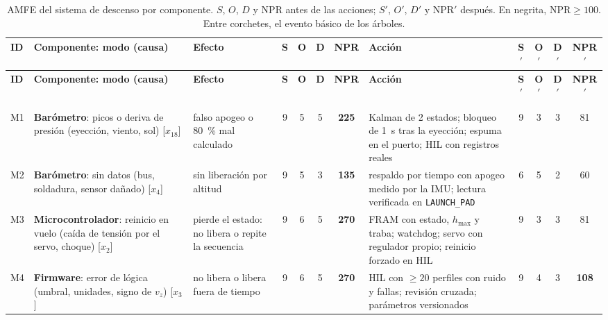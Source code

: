 \par\ifdim\dimexpr\pagegoal-\pagetotal\relax<7cm\newpage\fi
{\scriptsize
\setlength{\tabcolsep}{2.2pt}
\renewcommand{\arraystretch}{1.12}
\begin{longtable}{@{}>{\raggedright\arraybackslash}p{0.55cm}>{\raggedright\arraybackslash}p{3.9cm}>{\raggedright\arraybackslash}p{2.6cm}cccc>{\raggedright\arraybackslash}p{4.18cm}cccc@{}}
\caption{AMFE del sistema de descenso por componente. $S$, $O$, $D$ y NPR antes de las
acciones; $S'$, $O'$, $D'$ y NPR$'$ después. En negrita, $\mathrm{NPR}\ge100$. Entre
corchetes, el evento básico de los árboles.}\label{tab:confiabilidad-amfe}\\
\toprule
\textbf{ID} & \textbf{Componente: modo (causa)} & \textbf{Efecto} & \textbf{S} & \textbf{O} & \textbf{D} & \textbf{NPR} & \textbf{Acción} & \textbf{S$'$} & \textbf{O$'$} & \textbf{D$'$} & \textbf{NPR$'$}\\\midrule
\endfirsthead
\toprule
\textbf{ID} & \textbf{Componente: modo (causa)} & \textbf{Efecto} & \textbf{S} & \textbf{O} & \textbf{D} & \textbf{NPR} & \textbf{Acción} & \textbf{S$'$} & \textbf{O$'$} & \textbf{D$'$} & \textbf{NPR$'$}\\\midrule
\endhead
\midrule\multicolumn{12}{r}{\emph{continúa}}\\
\endfoot
\bottomrule
\endlastfoot
\multicolumn{12}{@{}l}{\textbf{Electrónica y software}}\\*
M1 & \textbf{Barómetro}: picos o deriva de presión (eyección, viento, sol) [$x_{18}$] & falso apogeo o \SI{80}{\percent} mal calculado & 9 & 5 & 5 & \textbf{225} & Kalman de 2 estados; bloqueo de \SI{1}{s} tras la eyección; espuma en el puerto; HIL con registros reales & 9 & 3 & 3 & 81\\
M2 & \textbf{Barómetro}: sin datos (bus, soldadura, sensor dañado) [$x_{4}$] & sin liberación por altitud & 9 & 5 & 3 & \textbf{135} & respaldo por tiempo con apogeo medido por la IMU; lectura verificada en \texttt{LAUNCH\_PAD} & 6 & 5 & 2 & 60\\
M3 & \textbf{Microcontrolador}: reinicio en vuelo (caída de tensión por el servo, choque) [$x_{2}$] & pierde el estado: no libera o repite la secuencia & 9 & 6 & 5 & \textbf{270} & FRAM con estado, $h_{\max}$ y traba; watchdog; servo con regulador propio; reinicio forzado en HIL & 9 & 3 & 3 & 81\\
M4 & \textbf{Firmware}: error de lógica (umbral, unidades, signo de $v_z$) [$x_{3}$] & no libera o libera fuera de tiempo & 9 & 6 & 5 & \textbf{270} & HIL con $\ge20$ perfiles con ruido y fallas; revisión cruzada; parámetros versionados & 9 & 4 & 3 & \textbf{108}\\

\end{longtable}}
